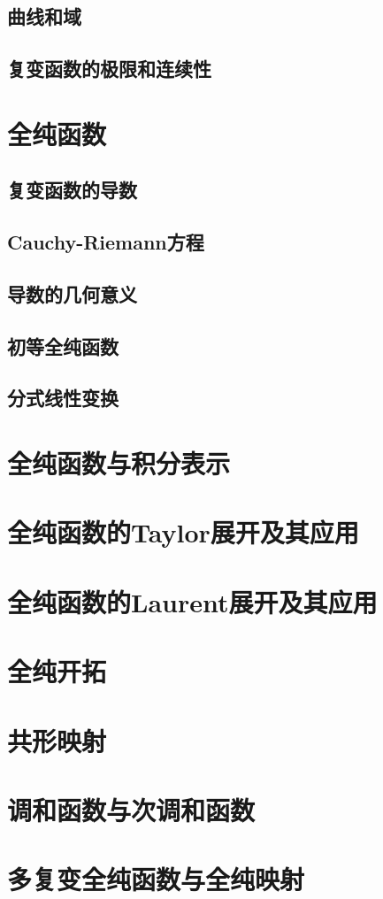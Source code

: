 \documentclass[12pt,fontset=none]{ctexbook}
\begin{document}
\newpage
\section{曲线和域}
\newpage
\section{复变函数的极限和连续性}
\newpage


\chapter{全纯函数}
\newpage
\section{复变函数的导数}
\newpage
\section{Cauchy-Riemann方程}
\newpage
\section{导数的几何意义}
\newpage
\section{初等全纯函数}
\newpage
\section{分式线性变换}
\newpage

\chapter{全纯函数与积分表示}
\chapter{全纯函数的Taylor展开及其应用}
\chapter{全纯函数的Laurent展开及其应用}
\chapter{全纯开拓}
\chapter{共形映射}
\chapter{调和函数与次调和函数}
\chapter{多复变全纯函数与全纯映射}
\end{document}

